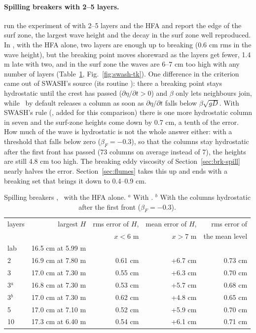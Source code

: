 \paragraph{Spilling breakers with 2--5 layers.} \citet{smit2013} run the
experiment of \citet{ting1994} with 2--5 layers and the HFA and report the
edge of the surf zone, the largest wave height and the decay in the surf
zone well reproduced. In \NHFOAM, with the HFA alone, two layers are enough
up to breaking (0.6 cm rms in the wave height), but the breaking point
moves shoreward as the layers get fewer, 1.4 m late with two, and in the
surf zone the waves are 6--7 cm too high with any number of layers
(Table~\ref{tab:swash-tk}, Fig.~\ref{fig:swash-tk}). One difference in the
criterion came out of SWASH's source (its routine ):
there a breaking point stays hydrostatic until the crest has passed
($\partial\eta/\partial t > 0$) and $\beta$ only lets neighbours join,
while \NHFOAM\ by default releases a column as soon as
$\partial\eta/\partial t$ falls below $\beta\sqrt{gD}$. With SWASH's rule
(, added for this comparison) there is one more
hydrostatic column in seven and the surf-zone heights come down by 0.7 cm,
a tenth of the error. How much of the wave is hydrostatic is not the whole
answer either: with a threshold that falls below zero ($\beta_F = -0.3$),
so that the columns stay hydrostatic after the first front has passed (73
columns on average instead of 7), the heights are still 4.8 cm too high.
The breaking eddy viscosity of Section~\ref{sec:brk-spill} nearly halves
the error. Section~\ref{sec:flumes} takes this up and ends with a breaking
set that brings it down to 0.4--0.9 cm.

\begin{table}[htbp]
\centering
\caption{Spilling breakers \citep{ting1994}, \NHFOAM\ with the HFA alone.
$^a$ With . $^b$ With the columns hydrostatic after
the first front ($\beta_F = -0.3$).}
\label{tab:swash-tk}
\footnotesize
\begin{tabular}{lrrrr}
\toprule
layers & largest $H$ & rms error of $H$, & mean error of $H$, & rms error of \\
 & & $x < 6$ m & $x > 7$ m & the mean level \\
\midrule
lab & 16.5 cm at 5.99 m & & & \\
2 & 16.9 cm at 7.80 m & 0.61 cm & +6.7 cm & 0.73 cm \\
3 & 17.0 cm at 7.30 m & 0.55 cm & +6.3 cm & 0.70 cm \\
3$^a$ & 16.8 cm at 7.30 m & 0.53 cm & +5.7 cm & 0.68 cm \\
3$^b$ & 17.0 cm at 7.30 m & 0.62 cm & +4.8 cm & 0.65 cm \\
5 & 17.0 cm at 7.10 m & 0.52 cm & +5.9 cm & 0.70 cm \\
10 & 17.3 cm at 6.40 m & 0.54 cm & +6.1 cm & 0.71 cm \\
\bottomrule
\end{tabular}
\end{table}

